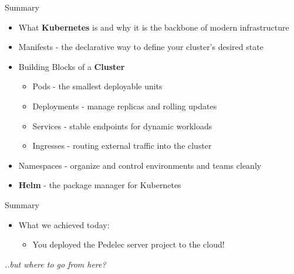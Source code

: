
\begin{frame}{Summary}
  \begin{itemize}
    \item What \textbf{Kubernetes} is and why it is the backbone of modern infrastructure
    \item Manifests - the declarative way to define your cluster's desired state
    \item Building Blocks of a \textbf{Cluster}
      \begin{itemize}
        \item Pods - the smallest deployable units
        \item Deployments - manage replicas and rolling updates
        \item Services - stable endpoints for dynamic workloads
        \item Ingresses - routing external traffic into the cluster
      \end{itemize}
    \item Namespaces - organize and control environments and teams cleanly
    \item \textbf{Helm} - the package manager for Kubernetes
  \end{itemize}
\end{frame}

\begin{frame}{Summary}
  \begin{itemize}
    \item What we achieved today:
      \begin{itemize}\item You deployed the Pedelec server project to the cloud!\end{itemize}
  \end{itemize}
  \vfill\centering{}\vfill
  \emph{..but where to go from here?}
\end{frame}

